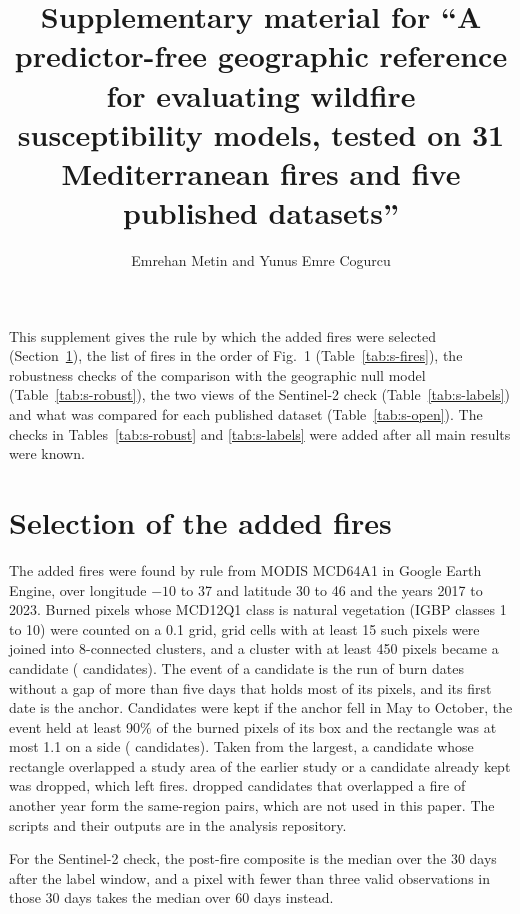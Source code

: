 \documentclass[11pt]{article}
\title{Supplementary material for ``A predictor-free geographic reference for evaluating wildfire susceptibility models, tested on 31 Mediterranean fires and five published datasets''}
\author{Emrehan Metin and Yunus Emre Cogurcu}
\date{}
\begin{document}
\maketitle

This supplement gives the rule by which the added fires were selected (Section~\ref{sec:s-selection}), the list of fires in the order of Fig.~1 (Table~\ref{tab:s-fires}), the robustness checks of the comparison with the geographic null model (Table~\ref{tab:s-robust}), the two views of the Sentinel-2 check (Table~\ref{tab:s-labels}) and what was compared for each published dataset (Table~\ref{tab:s-open}). The checks in Tables~\ref{tab:s-robust} and \ref{tab:s-labels} were added after all main results were known.

\section{Selection of the added fires}
\label{sec:s-selection}

The added fires were found by rule from MODIS MCD64A1 in Google Earth Engine, over longitude $-10$ to 37 and latitude 30 to 46 and the years 2017 to 2023. Burned pixels whose MCD12Q1 class is natural vegetation (IGBP classes 1 to 10) were counted on a 0.1\textdegree{} grid, grid cells with at least 15 such pixels were joined into 8-connected clusters, and a cluster with at least 450 pixels became a candidate (\vselCandidates{} candidates). The event of a candidate is the run of burn dates without a gap of more than five days that holds most of its pixels, and its first date is the anchor. Candidates were kept if the anchor fell in May to October, the event held at least 90\% of the burned pixels of its box and the rectangle was at most 1.1\textdegree{} on a side (\vselPass{} candidates). Taken from the largest, a candidate whose rectangle overlapped a study area of the earlier study or a candidate already kept was dropped, which left \vselKept{} fires. \vselRepeat{} dropped candidates that overlapped a fire of another year form the same-region pairs, which are not used in this paper. The scripts and their outputs are in the analysis repository.

For the Sentinel-2 check, the post-fire composite is the median over the 30 days after the label window, and a pixel with fewer than three valid observations in those 30 days takes the median over 60 days instead.


\end{document}
